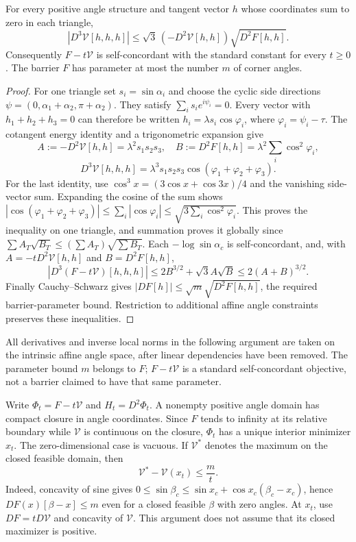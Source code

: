 \begin{proposition}
\label{prop:ipolyCompatibility}
For every positive angle structure and tangent vector $h$ whose
coordinates sum to zero in each triangle,
\begin{equation}
 |D^3\mathcal V[h,h,h]|
 \le\sqrt3\,(-D^2\mathcal V[h,h])\sqrt{D^2F[h,h]}.
 \label{eq:ipolyCompatibility}
\end{equation}
Consequently $F-t\mathcal V$ is self-concordant with the standard
constant for every $t\ge0$. The barrier $F$ has parameter at most
the number $m$ of corner angles.
\end{proposition}

\begin{proof}
For one triangle set $s_i=\sin\alpha_i$ and choose the cyclic side
directions $\psi=(0,\alpha_1+\alpha_2,\pi+\alpha_2)$.
They satisfy $\sum_i s_i e^{i\psi_i}=0$. Every vector with
$h_1+h_2+h_3=0$ can therefore be written
$h_i=\lambda s_i\cos\varphi_i$, where $\varphi_i=\psi_i-\tau$.
The cotangent energy identity and a trigonometric expansion give
\[
 A:=-D^2\mathcal V[h,h]=\lambda^2s_1s_2s_3,\quad
 B:=D^2F[h,h]=\lambda^2\sum_i\cos^2\varphi_i,
\]
\[
 D^3\mathcal V[h,h,h]
   =\lambda^3s_1s_2s_3\cos(\varphi_1+\varphi_2+\varphi_3).
\]
For the last identity, use $\cos^3 x=(3\cos x+\cos3x)/4$ and the
vanishing side-vector sum. Expanding the cosine of the sum shows
$|\cos(\varphi_1+\varphi_2+\varphi_3)|
\le\sum_i|\cos\varphi_i|\le\sqrt{3\sum_i\cos^2\varphi_i}$.
This proves the inequality on one triangle, and summation proves it
globally since $\sum A_T\sqrt{B_T}\le(\sum A_T)\sqrt{\sum B_T}$.
Each $-\log\sin\alpha_c$ is self-concordant, and, with
$A=-tD^2\mathcal V[h,h]$ and $B=D^2F[h,h]$,
\[
 |D^3(F-t\mathcal V)[h,h,h]|
 \le2B^{3/2}+\sqrt3 A\sqrt B\le2(A+B)^{3/2}.
\]
Finally Cauchy--Schwarz gives $|DF[h]|\le\sqrt m\sqrt{D^2F[h,h]}$,
the required barrier-parameter bound. Restriction to additional affine
angle constraints preserves these inequalities.
\end{proof}

All derivatives and inverse local norms in the following argument are
taken on the intrinsic affine angle space, after linear dependencies
have been removed. The parameter bound $m$ belongs to $F$;
$F-t\mathcal V$ is a standard self-concordant objective, not a barrier
claimed to have that same parameter.

Write $\Phi_t=F-t\mathcal V$ and $H_t=D^2\Phi_t$. A nonempty positive
angle domain has compact closure in angle coordinates. Since $F$ tends
to infinity at its relative boundary while $\mathcal V$ is continuous
on the closure, $\Phi_t$ has a unique interior minimizer $x_t$.
The zero-dimensional case is vacuous. If $\mathcal V^*$ denotes the
maximum on the closed feasible domain, then
\[
 \mathcal V^*-\mathcal V(x_t)\le\frac m t.
\]
Indeed, concavity of sine gives
$0\le\sin\beta_c\le\sin x_c+\cos x_c(\beta_c-x_c)$, hence
$DF(x)[\beta-x]\le m$ even for a closed feasible $\beta$ with zero
angles. At $x_t$, use $DF=tD\mathcal V$ and concavity of
$\mathcal V$. This argument does not assume that its closed maximizer
is positive.

